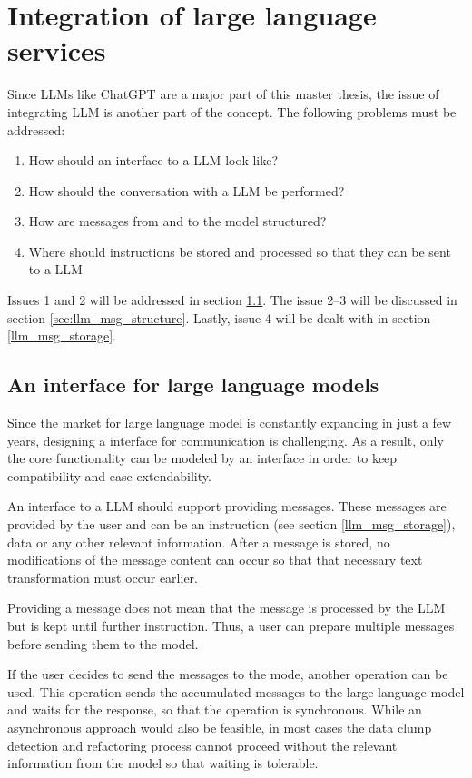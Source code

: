 \section{Integration of large language services}

Since \acp{LLM} like ChatGPT are a major part of this master thesis, the issue of integrating \ac{LLM} is another part of the concept. The following problems must be addressed:
\begin{enumerate}
    \item How should an interface to a \ac{LLM} look like?
    \item How should the conversation with a \ac{LLM} be performed?
    \item How are messages from and to the model structured?
    \item Where should instructions be stored and processed so that they can be sent to a \ac{LLM}
\end{enumerate}
Issues 1 and 2 will be addressed in section \ref{sec:llm_interface}. The issue 2--3 will be discussed in section \ref{sec:llm_msg_structure}. Lastly, issue 4 will be dealt with in section \ref{llm_msg_storage}.
\subsection{An interface for large language models}\label{sec:llm_interface}

Since the market for large language model is constantly expanding in just a few years, designing a interface for communication is challenging. As a result, only the core functionality can be modeled by an interface in order to keep compatibility and ease extendability. 

An interface to a \ac{LLM} should support providing messages. These messages are provided by the user and can be an instruction (see  section \ref{llm_msg_storage}), data or any other relevant information. After a message is stored,  no modifications of the message content can occur so that that necessary text transformation must occur earlier. 

Providing a message does not mean that the message is processed by the \ac{LLM} but is kept until further instruction. Thus, a user can prepare multiple messages before sending them to the model.

If the user decides to send the messages to the mode, another operation can be used. This operation sends the accumulated messages to the large language model and waits for the response, so that the operation is synchronous. While an asynchronous approach would also be feasible, in most cases the data clump detection and refactoring process cannot proceed without the relevant information from the model so that waiting is tolerable. 

